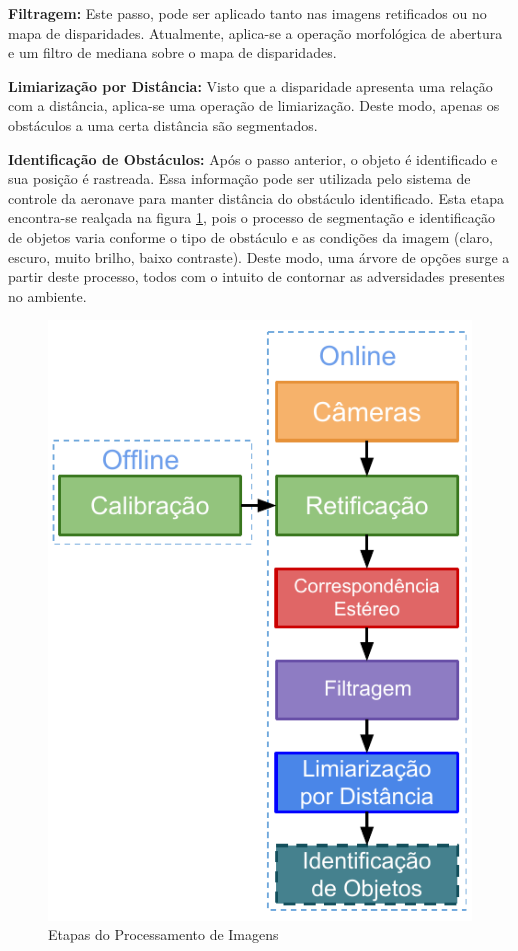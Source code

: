 \textbf{Filtragem:} Este passo, pode ser aplicado tanto nas imagens retificados ou no mapa de disparidades. Atualmente, aplica-se a operação morfológica de abertura e um filtro de mediana sobre o mapa de disparidades. 

\textbf{Limiarização por Distância:} Visto que a disparidade apresenta uma relação com a distância, aplica-se uma operação de limiarização. Deste modo, apenas os obstáculos a uma certa distância são segmentados.

\textbf{Identificação de Obstáculos:} Após o passo anterior, o objeto é identificado e sua posição é rastreada. Essa informação pode ser utilizada pelo sistema de controle da aeronave para manter distância do obstáculo identificado. Esta etapa encontra-se realçada na figura \ref{stereo_processor_steps}, pois o processo de segmentação e identificação de objetos varia conforme o tipo de obstáculo e as condições da imagem (claro, escuro, muito brilho, baixo contraste). Deste modo, uma árvore de opções surge a partir deste processo, todos com o intuito de contornar as adversidades presentes no ambiente.

\begin{figure}[H]
	\centering
	\includegraphics[scale=1.0]{./Resources/stereo_processor_steps3.pdf}
	\caption{Etapas do Processamento de Imagens}
	\label{stereo_processor_steps}
\end{figure}


